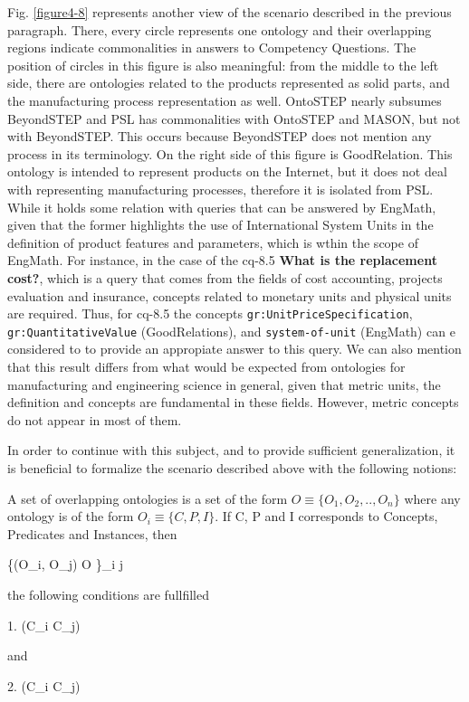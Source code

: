 Fig. \ref{figure4-8} represents another view of the scenario described in the previous paragraph. There, every circle represents one ontology and their overlapping regions indicate commonalities in answers to Competency Questions. The position of circles in this figure is also meaningful: from the middle to the left side, there are ontologies related to the products represented as solid   parts, and the manufacturing process representation as well. OntoSTEP nearly subsumes BeyondSTEP and PSL has commonalities with OntoSTEP and MASON, but not with BeyondSTEP. This occurs because BeyondSTEP does not mention any process in its terminology. On the right side of this figure is GoodRelation. This ontology is intended to represent products on the Internet, but it does not deal with representing manufacturing processes, therefore it is isolated from PSL. While it holds some relation with queries that can be answered by EngMath, given that the former highlights the use of International System  Units   in the definition of product features and parameters, which is wthin the scope of EngMath. \cbstart For instance, in the case of the cq-8.5 \textbf{What is the replacement cost?}, which is a query that comes from the fields of cost accounting, projects evaluation and insurance, concepts related to monetary units and physical units are required. Thus, for cq-8.5 the concepts \texttt{gr:UnitPriceSpecification}, \texttt{gr:QuantitativeValue} (GoodRelations), and \texttt{system-of-unit} (EngMath) can e considered to to provide an appropiate answer to this query\cbend. We can also mention that this result differs from what would be expected from ontologies for manufacturing and engineering science in general, given that metric units, the definition and concepts are fundamental in these fields. However, metric concepts do not appear in most of them.


In order to continue with this subject, and to provide sufficient generalization, it is beneficial to formalize the scenario described above with the following notions:


\begin{defn}\label{def4.10}
	A set of overlapping ontologies is a set of the form $O \equiv \{O_{1},O_{2},.., O_{n}\}$ where any ontology is of the form $O_{i} \equiv \{C,P,I\}$. If C, P and I corresponds to Concepts, Predicates and Instances, then 
	
	\forall \{(O_{i}, O_{j}) \in O \}_{i \neq j}
	
	the following conditions are fullfilled
	
	1. (C_{i} \cap C_{j}) \neq \varnothing
	
	and
	
	2. (C_{i} \neq C_{j})
	
\end{defn}



